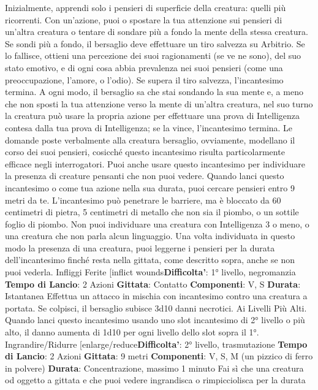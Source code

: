 \begin{multicols}{2}
Inizialmente, apprendi solo i pensieri di superficie della
creatura: quelli più ricorrenti. Con un’azione, puoi o
spostare la tua attenzione sui pensieri di un’altra
creatura o tentare di sondare più a fondo la mente della
stessa creatura. Se sondi più a fondo, il bersaglio deve
effettuare un tiro salvezza su Arbitrio. Se lo fallisce,
ottieni una percezione dei suoi ragionamenti (se ve ne
sono), del suo stato emotivo, e di ogni cosa abbia
prevalenza nei suoi pensieri (come una
preoccupazione, l’amore, o l’odio). Se supera il tiro
salvezza, l’incantesimo termina. A ogni modo, il
bersaglio sa che stai sondando la sua mente e, a meno
che non sposti la tua attenzione verso la mente di
un’altra creatura, nel suo turno la creatura può usare la
propria azione per effettuare una prova di Intelligenza
contesa dalla tua prova di Intelligenza; se la vince,
l’incantesimo termina.
Le domande poste verbalmente alla creatura bersaglio,
ovviamente, modellano il corso dei suoi pensieri,
cosicché questo incantesimo risulta particolarmente
efficace negli interrogatori.
Puoi anche usare questo incantesimo per individuare la
presenza di creature pensanti che non puoi vedere.
Quando lanci questo incantesimo o come tua azione
nella sua durata, puoi cercare pensieri entro 9 metri da
te. L’incantesimo può penetrare le barriere, ma è
bloccato da 60 centimetri di pietra, 5 centimetri di
metallo che non sia il piombo, o un sottile foglio di
piombo. Non puoi individuare una creatura con
Intelligenza 3 o meno, o una creatura che non parla
alcun linguaggio.
Una volta individuata in questo modo la presenza di
una creatura, puoi leggerne i pensieri per la durata
dell’incantesimo finché resta nella gittata, come
descritto sopra, anche se non puoi vederla.
Infliggi Ferite
[inflict wounds\textbf{Difficolta'}:
1° livello, negromanzia
\textbf{Tempo di Lancio}: 2 Azioni
\textbf{Gittata}: Contatto
\textbf{Componenti}: V, S
\textbf{Durata}: Istantanea
Effettua un attacco in mischia con incantesimo contro
una creatura a portata. Se colpisci, il bersaglio subisce
3d10 danni necrotici.
Ai Livelli Più Alti. Quando lanci questo incantesimo
usando uno slot incantesimo di 2° livello o più alto, il
danno aumenta di 1d10 per ogni livello dello slot sopra
il 1°.
Ingrandire/Ridurre
[enlarge/reduce\textbf{Difficolta'}:
2° livello, trasmutazione
\textbf{Tempo di Lancio}: 2 Azioni
\textbf{Gittata}: 9 metri
\textbf{Componenti}: V, S, M (un pizzico di ferro in polvere)
\textbf{Durata}: Concentrazione, massimo 1 minuto
Fai sì che una creatura od oggetto a gittata e che puoi
vedere ingrandisca o rimpicciolisca per la durata

\end{multicols}
